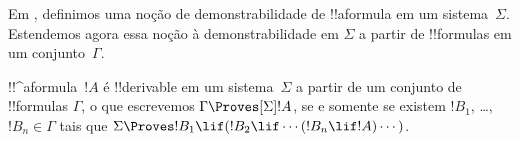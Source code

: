 \documentclass[../../../include/open-logic-section]{subfiles}
\begin{document}


Em , definimos uma noção de demonstrabilidade de
!!a{formula} em um sistema~$\Sigma$. Estendemos agora essa noção à
demonstrabilidade em $\Sigma$ a partir de !!{formula}s em um
conjunto~$\Gamma$.

\begin{defn}
  !!^a{formula}~$!A$ é !!{derivable} em um sistema~$\Sigma$ a partir de
  um conjunto de !!{formula}s $\Gamma$, o que escrevemos
  $\Gamma \Proves[\Sigma] !A$, se e somente se existem $!B_1$, \dots,
  $!B_n \in \Gamma$ tais que
  $\Sigma \Proves !B_1 \lif (!B_2 \lif \cdots (!B_n \lif !A)
  \cdots)$. 
\end{defn}
\end{document}
